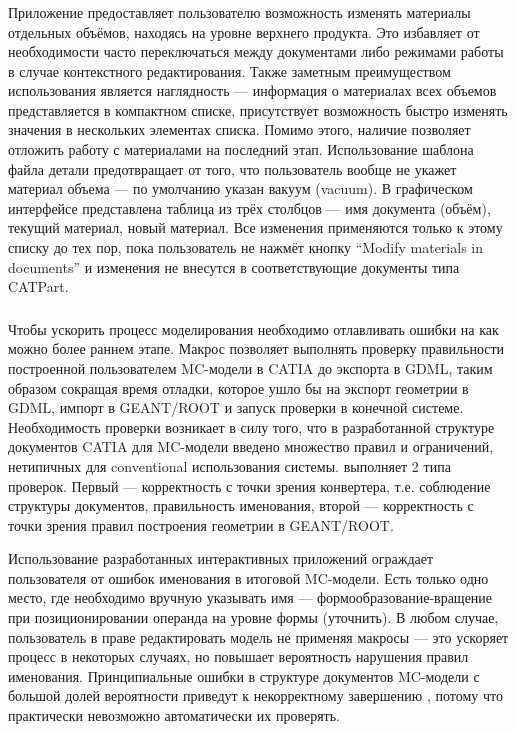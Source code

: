 \subsubsection{}\label{sec:secMacroMaterialsManager}

Приложение  предоставляет пользователю возможность изменять материалы отдельных объёмов, находясь на уровне верхнего продукта. Это избавляет от необходимости часто переключаться между документами либо режимами работы в случае контекстного редактирования. Также заметным преимуществом использования  является наглядность --- информация о материалах всех объемов представляется в компактном списке, присутствует возможность быстро изменять значения в нескольких элементах списка. Помимо этого, наличие  позволяет отложить работу с материалами на последний этап. Использование шаблона файла детали предотвращает от того, что пользователь вообще не укажет материал объема --- по умолчанию указан вакуум (vacuum). В графическом интерфейсе  представлена таблица из трёх столбцов --- имя документа (объём), текущий материал, новый материал. Все изменения применяются только к этому списку до тех пор, пока пользователь не нажмёт кнопку ``Modify materials in documents'' и изменения не внесутся в соответствующие документы типа CATPart.

\subsubsection{}\label{sec:secMacroChecker}

Чтобы ускорить процесс моделирования необходимо отлавливать ошибки на как можно более раннем этапе. Макрос  позволяет выполнять проверку правильности построенной пользователем MC-модели в CATIA до экспорта в GDML, таким образом сокращая время отладки, которое ушло бы на экспорт геометрии в GDML, импорт в GEANT/ROOT и запуск проверки в конечной системе. Необходимость проверки возникает в силу того, что в разработанной структуре документов CATIA для MC-модели введено множество правил и ограничений, нетипичных для \todo conventional использования системы.  выполняет 2 типа проверок. Первый --- корректность с точки зрения конвертера, т.е. соблюдение структуры документов, правильность именования, второй --- корректность с точки зрения правил построения геометрии в GEANT/ROOT.

Использование разработанных интерактивных приложений ограждает пользователя от ошибок именования в итоговой MC-модели. Есть только одно место, где необходимо вручную указывать имя --- формообразование-вращение при позиционировании операнда на уровне формы (\todo уточнить). В любом случае, пользователь в праве редактировать модель не применяя макросы --- это ускоряет процесс в некоторых случаях, но повышает вероятность нарушения правил именования. Принципиальные ошибки в структуре документов MC-модели с большой долей вероятности приведут к некорректному завершению , потому что практически невозможно автоматически их проверять.

